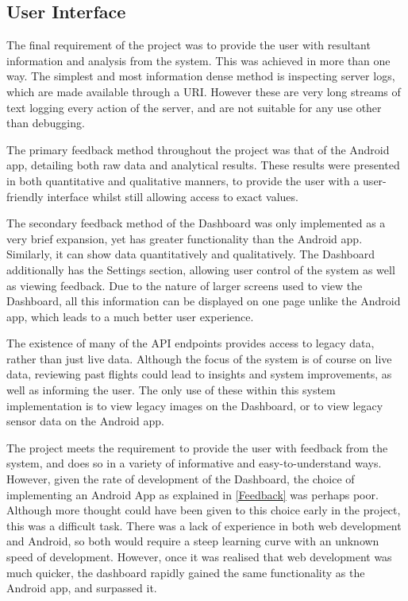 \documentclass{article}
\begin{document}
\subsection{User Interface}
The final requirement of the project was to provide the user with resultant information and analysis from the system. This was achieved in more than one way. The simplest and most information dense method is inspecting server logs, which are made available through a URI. However these are very long streams of text logging every action of the server, and are not suitable for any use other than debugging. 

The primary feedback method throughout the project was that of the Android app, detailing both raw data and analytical results. These results were presented in both quantitative and qualitative manners, to provide the user with a user-friendly interface whilst still allowing access to exact values.

The secondary feedback method of the Dashboard was only implemented as a very brief expansion, yet has greater functionality than the Android app. Similarly, it can show data quantitatively and qualitatively. The Dashboard additionally has the Settings section, allowing user control of the system as well as viewing feedback. Due to the nature of larger screens used to view the Dashboard, all this information can be displayed on one page unlike the Android app, which leads to a much better user experience. 

The existence of many of the API endpoints provides access to legacy data, rather than just live data. Although the focus of the system is of course on live data, reviewing past flights could lead to insights and system improvements, as well as informing the user. The only use of these within this system implementation is to view legacy images on the Dashboard, or to view legacy sensor data on the Android app.  

The project meets the requirement to provide the user with feedback from the system, and does so in a variety of informative and easy-to-understand ways. However, given the rate of development of the Dashboard, the choice of implementing an Android App as explained in \ref{Feedback} was perhaps poor. Although more thought could have been given to this choice early in the project, this was a difficult task. There was a lack of experience in both web development and Android, so both would require a steep learning curve with an unknown speed of development. However, once it was realised that web development was much quicker, the dashboard rapidly gained the same functionality as the Android app, and surpassed it. 
\end{document}
